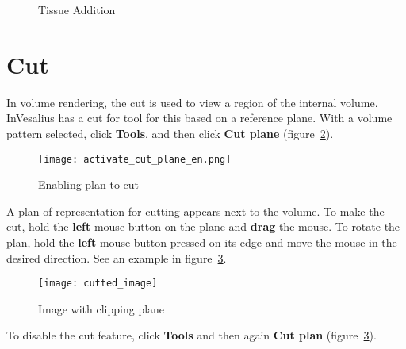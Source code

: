 \begin{figure}[!htb]
  \centering
  \hfill
  \hfill  
  \caption{Tissue Addition}
  \label{fig:raycasting_add}
\end{figure}

\newpage


\section{Cut}

In volume rendering, the cut is used to view a region of the internal volume. InVesalius has a cut for tool for this based on a reference plane. With a volume pattern selected, click \textbf{Tools}, and then click \textbf{Cut plane} (figure~\ref{fig:activate_cut_plane}).

\begin{figure}[!htb]
\centering
\texttt{[image: activate\_cut\_plane\_en.png]}
\caption{Enabling plan to cut}
\label{fig:activate_cut_plane}
\end{figure}

A plan of representation for cutting appears next to the volume. To make the cut, hold the \textbf{left} mouse button on the plane and \textbf{drag} the mouse. To rotate the plan, hold the \textbf{left} mouse button pressed on its edge and move the mouse in the desired direction. See an example in figure~\ref{fig:cutted_image}.

\begin{figure}[!htb]
\centering
\texttt{[image: cutted\_image]}
\caption{Image with clipping plane}
\label{fig:cutted_image}
\end{figure}

To disable the cut feature, click \textbf{Tools} and then again \textbf{Cut plan} (figure~\ref{fig:cutted_image}).